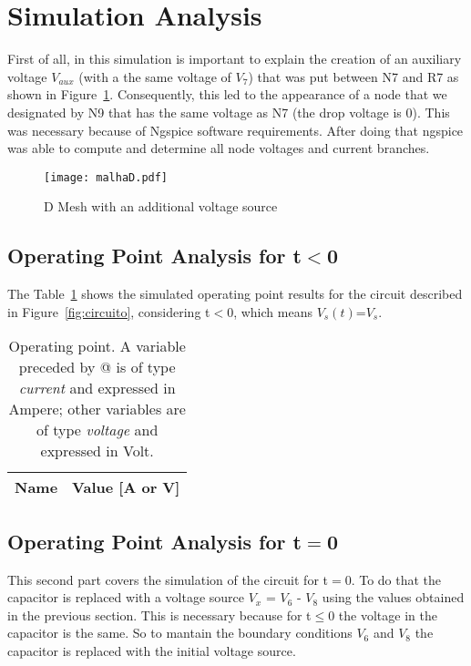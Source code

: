 \section{Simulation Analysis}

\label{sec:simulation}
First of all, in this simulation is important to explain the creation of an auxiliary voltage $V_{aux}$ (with a the same voltage of $V_{7}$) that was put between N7 and R7 as shown in Figure~\ref{fig:malhaD}. Consequently, this led to the appearance of a node that we designated by N9 that has the same voltage as N7 (the drop voltage is 0). This was necessary because of Ngspice software requirements. After doing that ngspice was able to compute and determine all node voltages and current branches.

\begin{figure}[H] \centering
\texttt{[image: malhaD.pdf]}
\caption{D Mesh with an additional voltage source} 
\label{fig:malhaD}
\end{figure}


\subsection{Operating Point Analysis for t$<$0}

The Table~\ref{tab:op1} shows the simulated operating point results for the circuit described in Figure~\ref{fig:circuito}, considering t$<$0, which means $V_{s}(t)$=$V_{s}$.

\begin{table}[H]
  \centering
  \begin{tabular}{|l|r|}
    \hline    
    {\bf Name} & {\bf Value [A or V]} \\ \hline
    
  \end{tabular}
  \caption{Operating point. A variable preceded by @ is of type {\em current}
    and expressed in Ampere; other variables are of type {\it voltage} and expressed in
    Volt.}
  \label{tab:op1}
\end{table}

\subsection{Operating Point Analysis for t$=$0}
This second part covers the simulation of the circuit for t$=$0. To do that the capacitor is replaced with a voltage source $V_{x}$ = $V_{6}$ - $V_{8}$ using the values obtained in the previous section. This is necessary because for t$\leq$0 the voltage in the capacitor is the same. So to mantain the boundary conditions $V_{6}$ and $V_{8}$ the capacitor is replaced with the initial voltage source.
 
